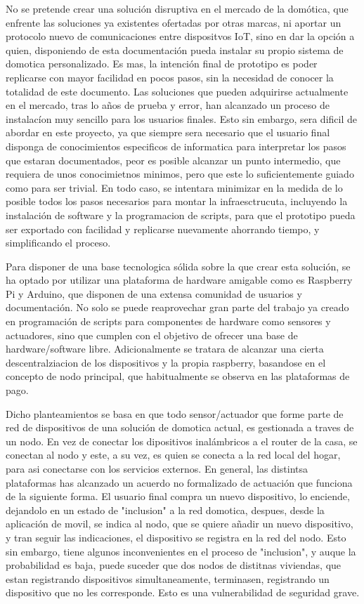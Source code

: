 No se pretende crear una solución disruptiva en el mercado de la domótica, que enfrente las soluciones ya existentes ofertadas por otras marcas, ni aportar un protocolo nuevo de comunicaciones entre dispositvos IoT, sino en dar la opción a quien, disponiendo de esta documentación pueda instalar su propio sistema de domotica personalizado. Es mas, la intención final de prototipo es poder replicarse con mayor facilidad en pocos pasos, sin la necesidad de conocer la totalidad de este documento. Las soluciones que pueden adquirirse actualmente en el mercado, tras lo años de prueba y error, han alcanzado un proceso de instalacíon muy sencillo para los usuarios finales. Esto sin embargo, sera dificil  de abordar en este proyecto, ya que siempre sera necesario que el usuario final disponga de conocimientos especificos de informatica para interpretar los pasos que estaran documentados, peor es posible alcanzar un punto intermedio, que requiera de unos conocimietnos minimos, pero que este lo suficientemente guiado como para ser trivial. En todo caso, se intentara minimizar en la medida de lo posible todos los pasos necesarios para montar la infraesctrucuta, incluyendo la instalación de software y la programacion de scripts, para que el prototipo pueda ser exportado con facilidad y replicarse nuevamente ahorrando tiempo, y simplificando el proceso.

Para disponer de una base tecnologica sólida sobre la que crear esta solución, se ha optado por utilizar una plataforma de hardware amigable como es Raspberry Pi y Arduino, que disponen de una extensa comunidad de usuarios y documentación. No solo se puede reaprovechar gran parte del trabajo ya creado en programación de scripts para componentes de hardware como sensores  y actuadores, sino que cumplen con el objetivo de ofrecer una base de hardware/software libre. Adicionalmente se tratara de alcanzar una cierta descentralziacion de los dispositivos y la propia raspberry, basandose en el concepto de nodo principal, que habitualmente se observa en las plataformas de pago.

Dicho planteamientos se basa en que todo sensor/actuador que forme parte de red de dispositivos de una solución de domotica actual, es gestionada a traves de un nodo. En vez de conectar los dipositivos inalámbricos a el router de la casa, se conectan al nodo y este, a su vez, es quien se conecta a la red local del hogar, para asi conectarse con los servicios externos. En general, las distintsa plataformas  has alcanzado un acuerdo no formalizado de actuación que funciona de la siguiente forma. El usuario final compra un nuevo dispositivo, lo enciende, dejandolo en un estado de "inclusion" a la red domotica, despues, desde la aplicación de movil, se indica al nodo, que se quiere añadir un nuevo dispositivo, y tran seguir las indicaciones, el dispositivo se registra en la red del nodo. Esto sin embargo, tiene algunos inconvenientes en el proceso de "inclusion", y auque la probabilidad es baja, puede suceder que dos nodos de distitnas viviendas, que estan registrando dispositivos simultaneamente, terminasen, registrando un dispositivo que no les corresponde. Esto es una vulnerabilidad de seguridad grave.

